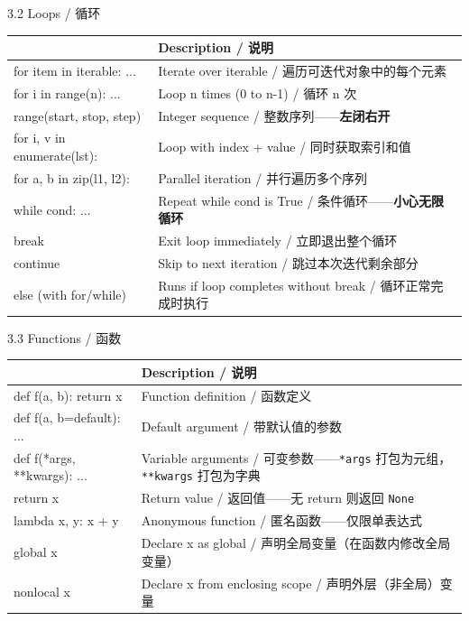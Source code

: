 \documentclass[11pt,a4paper]{report}
\let\oldtexttt\texttt
\renewcommand{\texttt}[1]{\textcolor{mainblue}{\oldtexttt{#1}}}
\begin{document}
\begin{cmdsection}{3.2  Loops / 循环}
\normalsize\renewcommand{\arraystretch}{1.4}
\centering
\begin{tabularx}{\textwidth}{@{}>{\ttfamily}l>{\raggedright\arraybackslash}X@{}}
\toprule
\multicolumn{1}{@{}l}{\textbf{Syntax}} & \textbf{Description / 说明} \\ \midrule
for item in iterable: ... & Iterate over iterable / 遍历可迭代对象中的每个元素 \\
for i in range(n): ...    & Loop n times (0 to n-1) / 循环 n 次 \\
range(start, stop, step)  & Integer sequence / 整数序列——\textbf{左闭右开} \\
for i, v in enumerate(lst): & Loop with index + value / 同时获取索引和值 \\
for a, b in zip(l1, l2):   & Parallel iteration / 并行遍历多个序列 \\
while cond: ...            & Repeat while cond is True / 条件循环——\textbf{小心无限循环} \\
break                      & Exit loop immediately / 立即退出整个循环 \\
continue                   & Skip to next iteration / 跳过本次迭代剩余部分 \\
else (with for/while)      & Runs if loop completes without break / 循环正常完成时执行 \\
\bottomrule
\end{tabularx}
\end{cmdsection}

\begin{cmdsection}{3.3  Functions / 函数}
\normalsize\renewcommand{\arraystretch}{1.4}
\centering
\begin{tabularx}{\textwidth}{@{}>{\ttfamily}l>{\raggedright\arraybackslash}X@{}}
\toprule
\multicolumn{1}{@{}l}{\textbf{Syntax}} & \textbf{Description / 说明} \\ \midrule
def f(a, b): return x       & Function definition / 函数定义 \\
def f(a, b=default): ...    & Default argument / 带默认值的参数 \\
def f(*args, **kwargs): ... & Variable arguments / 可变参数——\texttt{*args} 打包为元组，\texttt{**kwargs} 打包为字典 \\
return x                    & Return value / 返回值——无 return 则返回 \texttt{None} \\
lambda x, y: x + y          & Anonymous function / 匿名函数——仅限单表达式 \\
global x                    & Declare x as global / 声明全局变量（在函数内修改全局变量） \\
nonlocal x                  & Declare x from enclosing scope / 声明外层（非全局）变量 \\
\bottomrule
\end{tabularx}
\end{cmdsection}
\end{document}
